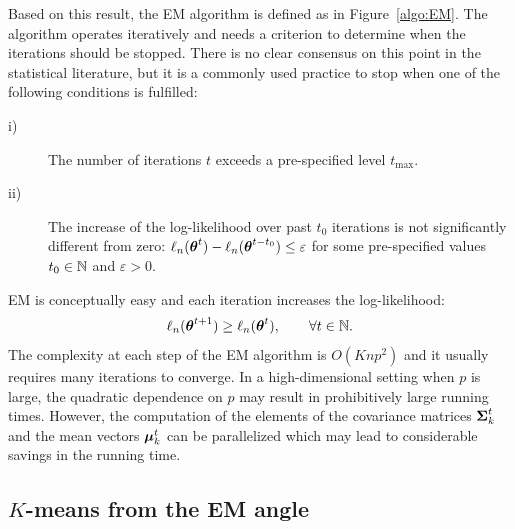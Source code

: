 Based on this result, the EM algorithm is defined as in Figure~\ref{algo:EM}.
The algorithm operates iteratively and needs a criterion to determine when
the iterations should be stopped. There is no clear consensus on this point in the
statistical literature, but it is a commonly used  practice to stop when one of the
following conditions is fulfilled:
\begin{description}
\item[i)]  The number of iterations $t$ exceeds a pre-specified level $t_{\max}$.
\item[ii)] The increase of the log-likelihood over past $t_0$ iterations is not
significantly different from zero: $\ell_n({\boldsymbol\theta}^{t})-\ell_n({\boldsymbol\theta}^{t-t_0})\le \varepsilon$
for some pre-specified values $t_0\in{\mathbb N}$ and $\varepsilon>0$.
\end{description}
EM is conceptually easy and each iteration increases the log-likelihood:
$$
\ell_n({\boldsymbol\theta}^{t+1})\ge \ell_n({\boldsymbol\theta}^{t}),\qquad \forall t\in{\mathbb N}.
$$
The complexity at each step of the EM algorithm is $O(Knp^2)$ and
it usually requires many iterations to converge. In a high-dimensional setting
when $p$ is large, the quadratic dependence on $p$ may result in prohibitively
large running times. However, the computation of the elements of the covariance
matrices $\boldsymbol\Sigma^t_k$ and the mean vectors $\boldsymbol\mu^t_k$ can be parallelized which
may lead to considerable savings in the running time.

\subsection{$K$-means from the EM angle}

